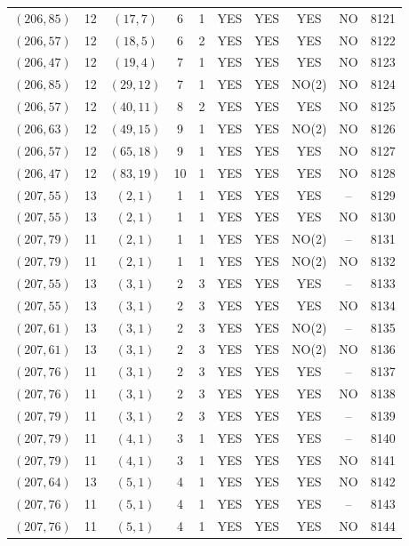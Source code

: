 \begin{longtable}{|c|c|c|c|c|c|c|c|c|c|}
$(206, 85)$ & 12 & $(17, 7)$ & 6 & 1 & YES & YES & YES & NO & 8121\\
$(206, 57)$ & 12 & $(18, 5)$ & 6 & 2 & YES & YES & YES & NO & 8122\\
$(206, 47)$ & 12 & $(19, 4)$ & 7 & 1 & YES & YES & YES & NO & 8123\\
$(206, 85)$ & 12 & $(29, 12)$ & 7 & 1 & YES & YES & NO(2) & NO & 8124\\
$(206, 57)$ & 12 & $(40, 11)$ & 8 & 2 & YES & YES & YES & NO & 8125\\
$(206, 63)$ & 12 & $(49, 15)$ & 9 & 1 & YES & YES & NO(2) & NO & 8126\\
$(206, 57)$ & 12 & $(65, 18)$ & 9 & 1 & YES & YES & YES & NO & 8127\\
$(206, 47)$ & 12 & $(83, 19)$ & 10 & 1 & YES & YES & YES & NO & 8128\\
$(207, 55)$ & 13 & $(2, 1)$ & 1 & 1 & YES & YES & YES & -- & 8129\\
$(207, 55)$ & 13 & $(2, 1)$ & 1 & 1 & YES & YES & YES & NO & 8130\\
$(207, 79)$ & 11 & $(2, 1)$ & 1 & 1 & YES & YES & NO(2) & -- & 8131\\
$(207, 79)$ & 11 & $(2, 1)$ & 1 & 1 & YES & YES & NO(2) & NO & 8132\\
$(207, 55)$ & 13 & $(3, 1)$ & 2 & 3 & YES & YES & YES & -- & 8133\\
$(207, 55)$ & 13 & $(3, 1)$ & 2 & 3 & YES & YES & YES & NO & 8134\\
$(207, 61)$ & 13 & $(3, 1)$ & 2 & 3 & YES & YES & NO(2) & -- & 8135\\
$(207, 61)$ & 13 & $(3, 1)$ & 2 & 3 & YES & YES & NO(2) & NO & 8136\\
$(207, 76)$ & 11 & $(3, 1)$ & 2 & 3 & YES & YES & YES & -- & 8137\\
$(207, 76)$ & 11 & $(3, 1)$ & 2 & 3 & YES & YES & YES & NO & 8138\\
$(207, 79)$ & 11 & $(3, 1)$ & 2 & 3 & YES & YES & YES & -- & 8139\\
$(207, 79)$ & 11 & $(4, 1)$ & 3 & 1 & YES & YES & YES & -- & 8140\\
$(207, 79)$ & 11 & $(4, 1)$ & 3 & 1 & YES & YES & YES & NO & 8141\\
$(207, 64)$ & 13 & $(5, 1)$ & 4 & 1 & YES & YES & YES & NO & 8142\\
$(207, 76)$ & 11 & $(5, 1)$ & 4 & 1 & YES & YES & YES & -- & 8143\\
$(207, 76)$ & 11 & $(5, 1)$ & 4 & 1 & YES & YES & YES & NO & 8144\\

\end{longtable}
